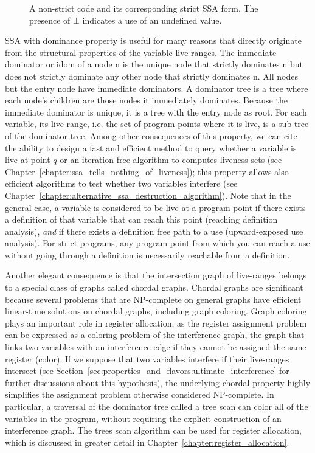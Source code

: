 \begin{figure}
\caption{\label{fig:properties_and_flavors:dom_property}A non-strict code and its corresponding strict SSA form. The presence of $\bot$ indicates a use of an undefined value.}
\end{figure}


SSA with dominance property is useful for many reasons that directly originate from the structural properties of the variable live-ranges. 
The immediate dominator or idom of a node n is the unique node that strictly dominates n but does not strictly dominate any other node that strictly dominates n. All nodes but the entry node have immediate dominators. A dominator tree is a tree where each node's children are those nodes it immediately dominates. Because the immediate dominator is unique, it is a tree with the entry node as root. 
For each variable, its live-range, i.e. the set of program points where it is live, is a sub-tree of the dominator tree.
Among other consequences of this property, we can cite the ability to design a fast and efficient method to query whether a variable is live at point $q$ or an iteration free algorithm to computes liveness sets (see Chapter~\ref{chapter:ssa_tells_nothing_of_liveness}); this property allows also efficient algorithms to test whether two variables interfere (see Chapter~\ref{chapter:alternative_ssa_destruction_algorithm}). Note that in the general case, a variable is considered to be live at a program point if there exists a definition of that variable that can reach this point (reaching definition analysis), \emph{and} if there exists a definition free path to a use (upward-exposed use analysis). For strict programs, any program point from which you can reach a use without going through a definition is necessarily reachable from a definition. 

Another elegant consequence is that the intersection graph of live-ranges belongs to a special class of
graphs called chordal graphs. Chordal graphs are significant because several
problems that are NP-complete on general graphs have efficient linear-time
solutions on chordal graphs, including graph coloring. Graph coloring plays
an important role in register allocation, as the register assignment problem can be expressed as a coloring problem of the interference graph, the graph that links two variables with an interference edge if they cannot be assigned the same register (color). If we suppose that two variables interfere if their live-ranges intersect (see Section~\ref{sec:properties_and_flavors:ultimate_interference} for further discussions about this hypothesis), the underlying chordal property highly simplifies the assignment problem otherwise considered NP-complete. In particular,
a traversal of the dominator tree called a tree scan can color all of
the variables in the program, without requiring the explicit construction
of an interference graph. The trees scan algorithm can be used
for register allocation, which is discussed
in greater detail in Chapter~\ref{chapter:register_allocation}. 

